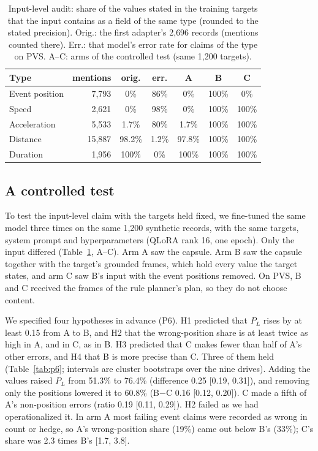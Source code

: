 \begin{table}[t]
\caption{Input-level audit: share of the values stated in the training targets that the input contains as a field of the same type (rounded to the stated precision). Orig.: the first adapter's 2{,}696 records (mentions counted there). Err.: that model's error rate for claims of the type on PVS. A--C: arms of the controlled test (same 1{,}200 targets).}
\label{tab:audit}
\centering
\scriptsize
\setlength{\tabcolsep}{2.6pt}
\begin{tabular}{@{}lrccccc@{}}
\toprule
Type & mentions & orig. & err. & A & B & C \\
\midrule
Event position & 7{,}793 & 0\% & 86\% & 0\% & 100\% & 0\% \\
Speed & 2{,}621 & 0\% & 98\% & 0\% & 100\% & 100\% \\
Acceleration & 5{,}533 & 1.7\% & 80\% & 1.7\% & 100\% & 100\% \\
Distance & 15{,}887 & 98.2\% & 1.2\% & 97.8\% & 100\% & 100\% \\
Duration & 1{,}956 & 100\% & 0\% & 100\% & 100\% & 100\% \\
\bottomrule
\end{tabular}
\end{table}

\subsection{A controlled test}
\label{sec:p6}
To test the input-level claim with the targets held fixed, we fine-tuned the same model three times on the same 1{,}200 synthetic records, with the same targets, system prompt and hyperparameters (QLoRA rank 16, one epoch).
Only the input differed (Table~\ref{tab:audit}, A--C). Arm A saw the capsule. Arm B saw the capsule together with the target's grounded frames, which hold every value the target states, and arm C saw B's input with the event positions removed.
On PVS, B and C received the frames of the rule planner's plan, so they do not choose content.

We specified four hypotheses in advance (P6). H1 predicted that $P_L$ rises by at least 0.15 from A to B, and H2 that the wrong-position share is at least twice as high in A, and in C, as in B. H3 predicted that C makes fewer than half of A's other errors, and H4 that B is more precise than C.
Three of them held (Table~\ref{tab:p6}; intervals are cluster bootstraps over the nine drives).
Adding the values raised $P_L$ from 51.3\% to 76.4\% (difference 0.25 [0.19, 0.31]), and removing only the positions lowered it to 60.8\% (B$-$C 0.16 [0.12, 0.20]). C made a fifth of A's non-position errors (ratio 0.19 [0.11, 0.29]).
H2 failed as we had operationalized it. In arm A most failing event claims were recorded as wrong in count or hedge, so A's wrong-position share (19\%) came out below B's (33\%); C's share was 2.3 times B's [1.7, 3.8].

